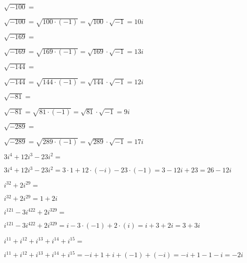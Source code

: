\documentclass[12pt,addpoints,x11names]{exam}
\begin{document}
\begin{questions}
\question[2] $\sqrt{-100}=$
   \begin{solutionbox}{.5in}
    $\sqrt{-100}=\sqrt{100\cdot(-1)}=\sqrt{100}\cdot\sqrt{-1}=10i$
  \end{solutionbox}
   \question[2] $\sqrt{-169}=$
   \begin{solutionbox}{.5in}
    $\sqrt{-169}=\sqrt{169\cdot(-1)}=\sqrt{169}\cdot\sqrt{-1}=13i$
  \end{solutionbox}
\question[2] $\sqrt{-144}=$
   \begin{solutionbox}{1in}
    $\sqrt{-144}=\sqrt{144\cdot(-1)}=\sqrt{144}\cdot\sqrt{-1}=12i$
  \end{solutionbox}
  \question[2] $\sqrt{-81}=$
   \begin{solutionbox}{1in}
    $\sqrt{-81}=\sqrt{81\cdot(-1)}=\sqrt{81}\cdot\sqrt{-1}=9i$
  \end{solutionbox}
\question[2] $\sqrt{-289}=$
  \begin{solutionbox}{1in}
    $\sqrt{-289}=\sqrt{289\cdot(-1)}=\sqrt{289}\cdot\sqrt{-1}=17i$
  \end{solutionbox}

  \pagebreak
\question[3] $3i^{4}+12i^{3}-23i^{2}=$
   \begin{solutionbox}{1.5in}
     $3i^{4}+12i^{3}-23i^{2}=3\cdot1+12\cdot(-i)-23\cdot(-1)=3-12i+23=26-12i$
   \end{solutionbox}
\question[3] $i^{32}+2i^{29}=$
  \begin{solutionbox}{1.5in}
    $i^{32}+2i^{29}=1+2i$
  \end{solutionbox}
 \question[3] $i^{121}-3i^{422}+2i^{329}=$
   \begin{solutionbox}{1.5in}
    $i^{121}-3i^{422}+2i^{329}=i-3\cdot(-1)+2\cdot(i)=i+3+2i=3+3i$
  \end{solutionbox} 
\question[3] $i^{11}+i^{12}+i^{13}+i^{14}+i^{15}=$
  \begin{solutionbox}{1.5in}
     $i^{11}+i^{12}+i^{13}+i^{14}+i^{15}=-i+1+i+(-1)+(-i)=-i+1-1-i=-2i$
  \end{solutionbox}
  \pagebreak







\end{questions}
\end{document}
